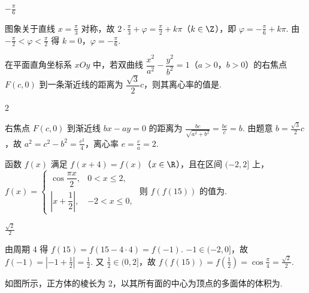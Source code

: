 \begin{answer}
\(-\frac{\pi}{6}\)
\end{answer}

\begin{solution}
图象关于直线 \(x=\frac{\pi}{3}\) 对称，故 \(2\cdot\frac{\pi}{3}+\varphi=\frac{\pi}{2}+k\pi\)（\(k\in\Z\)），即 \(\varphi=-\frac{\pi}{6}+k\pi\). 由 \(-\frac{\pi}{2}<\varphi<\frac{\pi}{2}\) 得 \(k=0\)，\(\varphi=-\frac{\pi}{6}\).
\end{solution}

\begin{problem}
在平面直角坐标系 \(xOy\) 中，若双曲线 \(\dfrac{x^2}{a^2}-\dfrac{y^2}{b^2}=1\)（\(a>0\)，\(b>0\)）的右焦点 \(F(c,0)\) 到一条渐近线的距离为 \(\dfrac{\sqrt3}{2}c\)，则其离心率的值是\fillinblank{}.
\end{problem}

\begin{answer}
\(2\)
\end{answer}

\begin{solution}
右焦点 \(F(c,0)\) 到渐近线 \(bx-ay=0\) 的距离为 \(\frac{bc}{\sqrt{a^2+b^2}}=\frac{bc}{c}=b\). 由题意 \(b=\frac{\sqrt3}{2}c\)，故 \(a^2=c^2-b^2=\frac{c^2}{4}\)，离心率 \(e=\frac{c}{a}=2\).
\end{solution}

\begin{problem}
函数 \(f(x)\) 满足 \(f(x+4)=f(x)\)（\(x\in\R\)），且在区间 \((-2,2]\) 上，
\(f(x)=\begin{cases}
\cos\dfrac{\pi x}{2}, & 0<x\le2,\\
\left|x+\dfrac12\right|, & -2<x\le0,
\end{cases}\)
则 \(f(f(15))\) 的值为\fillinblank{}.
\end{problem}

\begin{answer}
\(\frac{\sqrt{2}}{2}\)
\end{answer}

\begin{solution}
由周期 \(4\) 得 \(f(15)=f(15-4\cdot4)=f(-1)\). \(-1\in(-2,0]\)，故 \(f(-1)=\left|-1+\frac12\right|=\frac12\). 又 \(\frac12\in(0,2]\)，故 \(f(f(15))=f\left(\frac12\right)=\cos\frac{\pi}{4}=\frac{\sqrt2}{2}\).
\end{solution}

\begin{problem}
如图所示，正方体的棱长为 \(2\)，以其所有面的中心为顶点的多面体的体积为\fillinblank{}.

\begin{center}
\end{center}
\end{problem}


